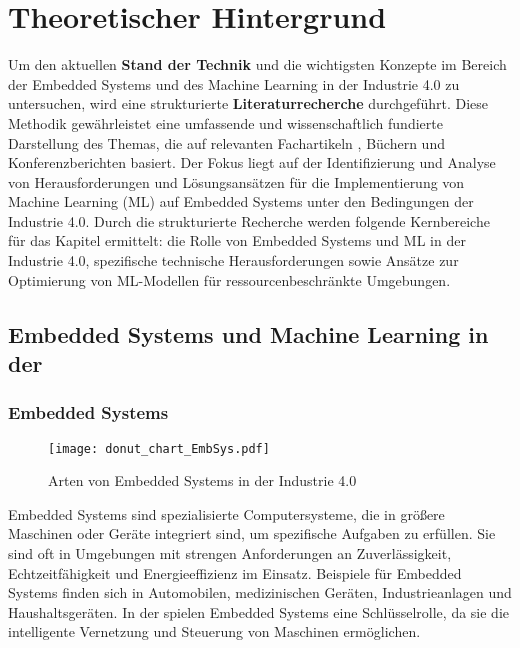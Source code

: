 \chapter{Theoretischer Hintergrund}
\label{chap:theoretische_hintergrund}

Um den aktuellen \textbf{Stand der Technik} und die wichtigsten Konzepte im Bereich der Embedded Systems und des 
Machine Learning in der Industrie 4.0 zu untersuchen, wird eine strukturierte \textbf{Literaturrecherche} durchgeführt. 
Diese Methodik gewährleistet eine umfassende und wissenschaftlich fundierte Darstellung des Themas, die auf relevanten 
Fachartikeln \cite{10087221}, Büchern \cite{Soldatos2024} und Konferenzberichten \cite{8119409} basiert. Der Fokus liegt 
auf der Identifizierung und Analyse von Herausforderungen und Lösungsansätzen für die Implementierung von Machine Learning (ML) 
auf Embedded Systems unter den Bedingungen der Industrie 4.0. Durch die strukturierte Recherche werden folgende Kernbereiche 
für das Kapitel ermittelt: die Rolle von Embedded Systems und ML in der Industrie 4.0, spezifische technische Herausforderungen 
sowie Ansätze zur Optimierung von ML-Modellen für ressourcenbeschränkte Umgebungen.


\section{Embedded Systems und Machine Learning in der \Iviernull}

\subsection{Embedded Systems}
\begin{figure}[h]
    \centering
    \texttt{[image: donut\_chart\_EmbSys.pdf]}
    \caption{Arten von Embedded Systems in der Industrie 4.0} 
    \label{fig:donut_chart_EmbSys}
\end{figure}
Embedded Systems sind spezialisierte Computersysteme, die in größere Maschinen oder Geräte integriert sind,
um spezifische Aufgaben zu erfüllen. Sie sind oft in Umgebungen mit strengen Anforderungen an Zuverlässigkeit, 
Echtzeitfähigkeit und Energieeffizienz im Einsatz. Beispiele für Embedded Systems finden sich in Automobilen, 
medizinischen Geräten, Industrieanlagen und Haushaltsgeräten. In der \Iviernull spielen Embedded Systems eine Schlüsselrolle, 
da sie die intelligente Vernetzung und Steuerung von Maschinen ermöglichen. 

\subsection{\Iviernull}

